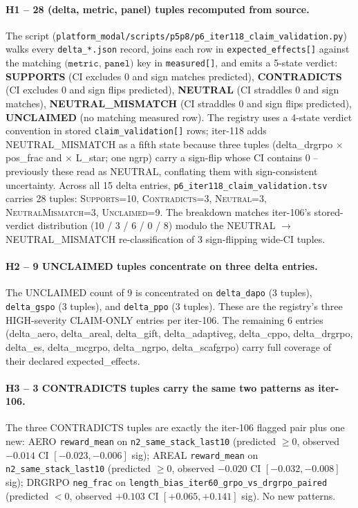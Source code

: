 \paragraph{H1 -- 28 (delta, metric, panel) tuples recomputed from source.}
The script (\texttt{platform_modal/scripts/p5p8/p6\_iter118\_claim\_validation.py}) walks
every \texttt{delta\_*.json} record, joins each row in
\texttt{expected\_effects[]} against the matching $\texttt{(metric, panel)}$
key in \texttt{measured[]}, and emits a 5-state verdict:
\textbf{SUPPORTS} (CI excludes 0 and sign matches predicted),
\textbf{CONTRADICTS} (CI excludes 0 and sign flips predicted),
\textbf{NEUTRAL} (CI straddles 0 and sign matches),
\textbf{NEUTRAL\_MISMATCH} (CI straddles 0 and sign flips predicted),
\textbf{UNCLAIMED} (no matching measured row). The registry uses a 4-state
verdict convention in stored \texttt{claim\_validation[]} rows; iter-118
adds NEUTRAL\_MISMATCH as a fifth state because three tuples (delta\_drgrpo
$\times$ pos\_frac and $\times$ L\_star; one ngrp) carry a sign-flip whose
CI contains 0 -- previously these read as NEUTRAL, conflating them with
sign-consistent uncertainty. Across all 15 delta entries,
\texttt{p6\_iter118\_claim\_validation.tsv} carries 28 tuples:
\textsc{Supports}=10, \textsc{Contradicts}=3, \textsc{Neutral}=3,
\textsc{NeutralMismatch}=3, \textsc{Unclaimed}=9.
The breakdown matches iter-106's stored-verdict distribution (10 / 3 / 6 /
0 / 8) modulo the NEUTRAL $\to$ NEUTRAL\_MISMATCH re-classification of 3
sign-flipping wide-CI tuples.

\paragraph{H2 -- 9 UNCLAIMED tuples concentrate on three delta entries.}
The UNCLAIMED count of 9 is concentrated on \texttt{delta\_dapo}
(3 tuples), \texttt{delta\_gspo} (3 tuples), and \texttt{delta\_ppo}
(3 tuples). These are the registry's three HIGH-severity CLAIM-ONLY
entries per iter-106. The remaining 6 entries (delta\_aero, delta\_areal,
delta\_gift, delta\_adaptiveg, delta\_cppo, delta\_drgrpo, delta\_es,
delta\_mcgrpo, delta\_ngrpo, delta\_scafgrpo) carry full coverage of
their declared expected\_effects.

\paragraph{H3 -- 3 CONTRADICTS tuples carry the same two patterns as iter-106.}
The three CONTRADICTS tuples are exactly the iter-106 flagged pair plus
one new: AERO \texttt{reward\_mean} on \texttt{n2\_same\_stack\_last10}
(predicted $\geq 0$, observed $-0.014$ CI $[-0.023, -0.006]$ sig);
AREAL \texttt{reward\_mean} on \texttt{n2\_same\_stack\_last10}
(predicted $\geq 0$, observed $-0.020$ CI $[-0.032, -0.008]$ sig);
DRGRPO \texttt{neg\_frac} on
\texttt{length\_bias\_iter60\_grpo\_vs\_drgrpo\_paired}
(predicted $< 0$, observed $+0.103$ CI $[+0.065, +0.141]$ sig). No new
patterns.

